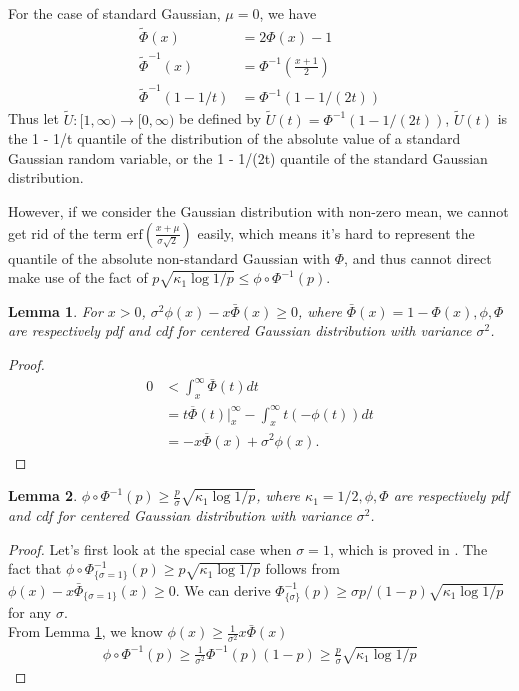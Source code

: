 \documentclass{article}
\theoremstyle{plain}
\newtheorem{lemma}{Lemma}
\begin{document}
For the case of standard Gaussian, $\mu = 0$,  we have 
\begin{align}
    \tilde{\Phi}(x) &= 2 \Phi(x) - 1\\
    \tilde{\Phi}^{-1}(x) &= \Phi^{-1}(\frac{x+1}{2})\\
    \tilde{\Phi}^{-1}(1 - 1/t) &= \Phi^{-1}(1 - 1/(2t))
\end{align}
Thus let $\tilde{U} : [ 1, \infty ) \rightarrow[0, \infty)$ be defined by $\widetilde{U}(t)=\Phi^{-1}(1-1 /(2 t))$, $\widetilde{U}(t)$ is the 1 - 1/t quantile of the distribution of the absolute value of a standard Gaussian random variable, or the 1 - 1/(2t) quantile of the standard Gaussian distribution. 

However, if we consider the Gaussian distribution with non-zero mean, we cannot get rid of the term $\text{erf}(\frac{x + \mu}{\sigma \sqrt{2}})$ easily, which means it's hard to represent the quantile of the absolute non-standard Gaussian with $\Phi$, and thus cannot direct make use of the fact of $p \sqrt{\kappa_{1} \log 1 / p} \leq \phi \circ \Phi^{-1}(p)$.


\begin{lemma}
\label{lemma mills' ratio}
    For $x >0$, $ \sigma^2 \phi(x) -x \bar{\Phi}(x) \geq 0$, where $\bar{\Phi}(x) = 1 - \Phi(x),  \phi, \Phi$ are respectively pdf and cdf for centered Gaussian distribution with variance $\sigma^2$.
\end{lemma}
\begin{proof}
\begin{align}
    0 &< \int_x^\infty \bar{\Phi}(t) dt\\
    & = t \overline{\Phi}\left.(t)\right|_{x} ^{\infty}-\int_x^{\infty} t(-\phi(t)) d t\\
    &= -x \overline{\Phi}(x)+ \sigma^2 \phi(x).
\end{align}
\end{proof}

\begin{lemma}
    $\phi \circ \Phi^{-1}(p) \geq \frac{p}{\sigma} \sqrt{\kappa_1 \log 1/p}$,  where $\kappa_{1} = 1 / 2, \phi, \Phi$ are respectively pdf and cdf for centered Gaussian distribution with variance $\sigma^2$.
\end{lemma}
\begin{proof}
Let's first look at the special case when $\sigma = 1$, which is proved in \cite{boucheron2012}. The fact that $\phi \circ \Phi_{\{\sigma = 1\}}^{-1}(p) \geq p \sqrt{\kappa_1 \log 1/p}$ follows from $\phi(x) - x \bar{\Phi}_{\{\sigma = 1\}}(x) \geq 0$. We can derive $\Phi_{\{\sigma\}}^{-1}(p) \geq \sigma p/(1-p) \sqrt{\kappa_1 \log 1/p}$ for any $\sigma$. \\

From Lemma \ref{lemma mills' ratio}, we know $ \phi(x) \geq \frac{1}{\sigma^2}x \bar{\Phi}(x)$
\begin{align}
    \phi \circ \Phi^{-1}(p) \geq \frac{1}{\sigma^2} \Phi^{-1}(p) (1-p) \geq \frac{p}{\sigma} \sqrt{\kappa_1 \log 1/p}
\end{align}
\end{proof}
\end{document}
